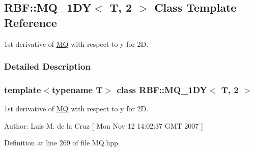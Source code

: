 \hypertarget{classRBF_1_1MQ__1DY_3_01T_00_012_01_4}{
\subsection{RBF::MQ\_\-1DY$<$ T, 2 $>$ Class Template Reference}
\label{classRBF_1_1MQ__1DY_3_01T_00_012_01_4}
}
1st derivative of \hyperlink{classRBF_1_1MQ}{MQ} with respect to y for 2D.  




\subsubsection{Detailed Description}
\subsubsection*{template$<$typename T$>$ class RBF::MQ\_\-1DY$<$ T, 2 $>$}

1st derivative of \hyperlink{classRBF_1_1MQ}{MQ} with respect to y for 2D. 

\begin{Desc}
\item[Author:]Luis M. de la Cruz \mbox{[} Mon Nov 12 14:02:37 GMT 2007 \mbox{]} \end{Desc}


Definition at line 269 of file MQ.hpp.